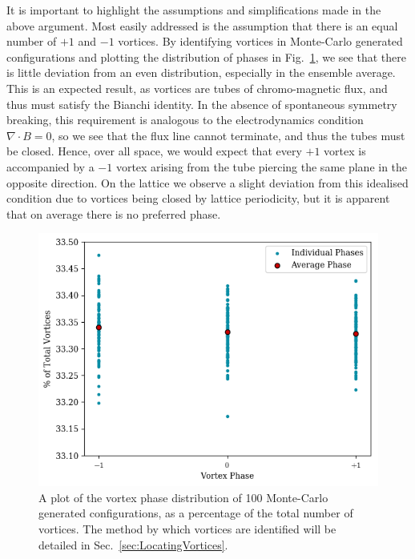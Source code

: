 It is important to highlight the assumptions and simplifications made in the above argument. Most easily addressed is the assumption that there is an equal number of $+1$ and $-1$ vortices. By identifying vortices in Monte-Carlo generated configurations and plotting the distribution of phases in Fig.~\ref{fig:VortexDistribution}, we see that there is little deviation from an even distribution, especially in the ensemble average. This is an expected result, as vortices are tubes of chromo-magnetic flux, and thus must satisfy the Bianchi identity. In the absence of spontaneous symmetry breaking, this requirement is analogous to the electrodynamics condition $\nabla \cdot B = 0$, so we see that the flux line cannot terminate, and thus the tubes must be closed. Hence, over all space, we would expect that every $+1$ vortex is accompanied by a $-1$ vortex arising from the tube piercing the same plane in the opposite direction. On the lattice we observe a slight deviation from this idealised condition due to vortices being closed by lattice periodicity, but it is apparent that on average there is no preferred phase.\\
%
\begin{figure}[h]
\includegraphics{./VortexDistribution.png}
\caption{\label{fig:VortexDistribution}A plot of the vortex phase distribution of 100 Monte-Carlo generated configurations, as a percentage of the total number of vortices. The method by which vortices are identified will be detailed in Sec.~\ref{sec:LocatingVortices}.}
\end{figure}
%

